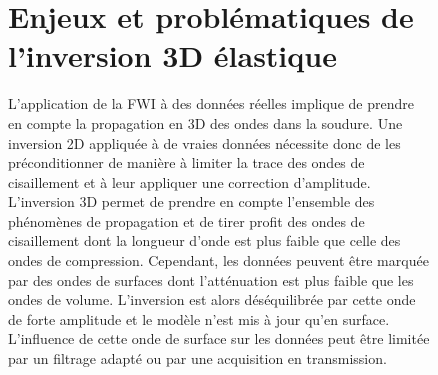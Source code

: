 \begin{figure}[h!]






\section{Enjeux et problématiques de l'inversion 3D élastique}

L'application de la FWI à des données réelles implique de prendre en compte la propagation en 3D des ondes dans la soudure. Une inversion 2D appliquée à de vraies données nécessite donc de les préconditionner de manière à limiter la trace des ondes de cisaillement et à leur appliquer une correction d'amplitude. \\

L'inversion 3D permet de prendre en compte l'ensemble des phénomènes de propagation et de tirer profit des ondes de cisaillement dont la longueur d'onde est plus faible que celle des ondes de compression. Cependant, les données peuvent être marquée par des ondes de surfaces dont l'atténuation est plus faible que les ondes de volume.  L'inversion est alors déséquilibrée par cette onde de forte amplitude et le modèle n'est mis à jour qu'en surface. L'influence de cette onde de surface sur les données peut être limitée par un filtrage adapté ou par une acquisition en transmission.\\ 


\end{figure}
